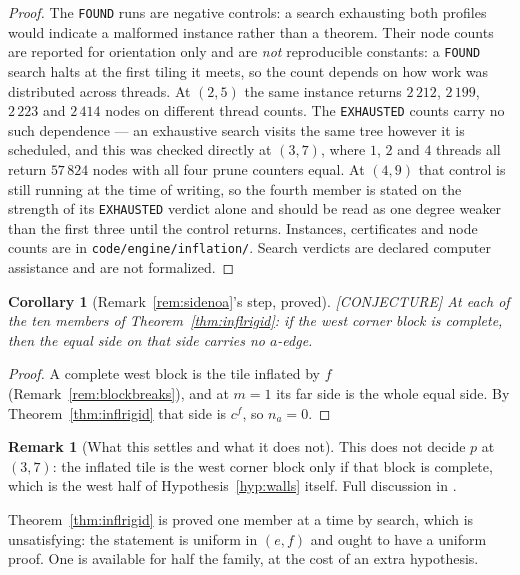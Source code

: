 \documentclass[11pt,reqno]{amsart}
\theoremstyle{plain}
\newtheorem{corollary}[theorem]{Corollary}
\theoremstyle{definition}
\newtheorem{remark}[theorem]{Remark}
\newcommand{\lab}[1]{\hfill\textnormal{\footnotesize\textsc{[#1]}}}
\begin{document}
\begin{proof}
The \texttt{FOUND} runs are negative controls: a search exhausting both profiles would indicate a
malformed instance rather than a theorem. Their node counts are reported for orientation only and are
\emph{not} reproducible constants: a \texttt{FOUND} search halts at the first tiling it meets, so the
count depends on how work was distributed across threads. At $(2,5)$ the same instance returns
$2\,212$, $2\,199$, $2\,223$ and $2\,414$ nodes on different thread counts. The
\texttt{EXHAUSTED} counts carry no such dependence --- an exhaustive search visits the same tree
however it is scheduled, and this was checked directly at $(3,7)$, where $1$, $2$ and $4$ threads all
return $57\,824$ nodes with all four prune counters equal. At $(4,9)$ that control is still running at the time of
writing, so the fourth member is stated on the strength of its \texttt{EXHAUSTED} verdict alone and
should be read as one degree weaker than the first three until the control returns. Instances, certificates and node counts are in
\texttt{code/engine/inflation/}. Search verdicts are declared computer assistance and are not
formalized.
\end{proof}

\begin{corollary}[Remark~\ref{rem:sidenoa}'s step, proved]\label{cor:sidenoa-proved}\lab{CONJECTURE}
At each of the ten members of Theorem~\ref{thm:inflrigid}: if the west corner block is complete, then the equal side on that side
carries no $a$-edge.
\end{corollary}

\begin{proof}
A complete west block is the tile inflated by $f$ (Remark~\ref{rem:blockbreaks}), and at $m=1$ its far
side is the whole equal side. By Theorem~\ref{thm:inflrigid} that side is $c^f$, so $n_a=0$.
\end{proof}

\begin{remark}[What this settles and what it does not]\label{rem:inflrigidscope}
This does not decide $p$ at $(3,7)$: the inflated tile is the west corner block only if that block is complete, which is the west half of Hypothesis~\ref{hyp:walls} itself. Full discussion in \cite{Obstructions}.
\end{remark}

Theorem~\ref{thm:inflrigid} is proved one member at a time by search, which is unsatisfying: the
statement is uniform in $(e,f)$ and ought to have a uniform proof. One is available for half the
family, at the cost of an extra hypothesis.
\end{document}
